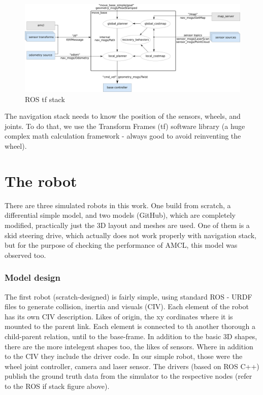 \documentclass[10pt,journal,compsoc]{IEEEtran}
\begin{document}
    \begin{figure}[thptb]
        \centering
        \includegraphics[width=\linewidth]{overview_tf.png}
        \caption{ROS tf stack}
        \label{fig:robot2}
    \end{figure}

    The	navigation stack needs to know the position	of the sensors, wheels, and joints. To do that, we use the	Transform Frames (tf) software library (a huge complex math calculation framework - always good to avoid reinventing the wheel).	

    \section{The robot}
    There are three simulated robots in this work. One build from scratch, a differential simple model, and two models (GitHub), which are completely modified, practically just the 3D layout and meshes are used. One of them is a skid steering drive, which actually does not work properly with navigation stack, but for the purpose of checking the performance of AMCL, this model was observed too.
    
    \subsubsection{Model design}
    The first robot (scratch-designed) is fairly simple, using standard ROS - URDF files to generate collision, inertia and visuals (CIV). Each element of the robot has its own CIV description. Likes of origin, the xy cordinates where it is mounted to the parent link. Each element is connected to th another thorough a child-parent relation, until to the base-frame. In addition to the basic 3D shapes, there are the more intelegent shapes too, the likes of sensors. Where in addition to the CIV they include the driver code. In our simple robot, those were the wheel joint controller, camera and laser sensor. The drivers (based on ROS C++) publish the ground truth data from the simulator to the respective nodes (refer to the ROS if stack figure above).
\end{document}
